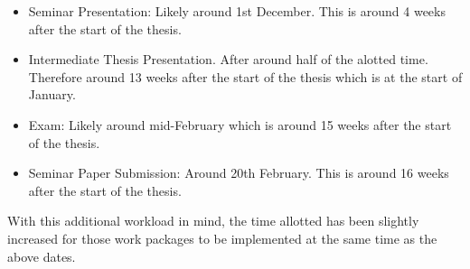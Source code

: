 \documentclass[
	english,
	accentcolor=9c,%
  marginpar=0cm %
	]{tudapub}
\begin{document}
\begin{itemize}
  \item Seminar Presentation: Likely around 1st December.
    This is around 4 weeks after the start of the thesis.
  \item Intermediate Thesis Presentation. After around half of the alotted time.
    Therefore around 13 weeks after the start of the thesis which is at the
    start of January.
  \item Exam: Likely around mid-February which is around 15 weeks after the
    start of the thesis.
  \item Seminar Paper Submission: Around 20th February.
    This is around 16 weeks after the start of the thesis.
\end{itemize}
%
With this additional workload in mind, the time allotted has been slightly
increased for those work packages to be implemented at the same time as the
above dates.

\printbibliography
\end{document}
